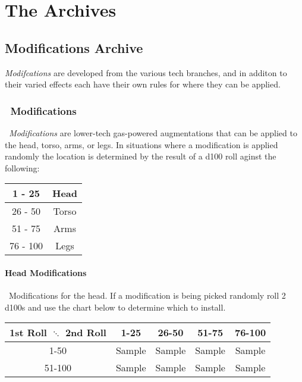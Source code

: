 \part{The Archives}\label{part:archives}
\chapter{Modifications Archive}\label{ch:ref_enhance}
\emph{Modifcations} are developed from the various tech branches, and in additon to their varied effects each have their own rules for where they can be applied. 

\section{\dieselt\ Modifications}\label{sec:diesel_mods}
\emph{\dieselt\ Modifications} are lower-tech gas-powered augmentations that can be applied to the head, torso, arms, or legs. In situations where a modification is applied randomly the location is determined by the result of a d100 roll aginst the following:
\begin{center}
\begin{tabular}{c | c}
1 - 25 & Head \\
\hline
26 - 50 & Torso \\
\hline
51 - 75 & Arms \\
\hline
76 - 100 & Legs \\
\end{tabular}
\end{center}

\subsection{Head Modifications}
\dieselt\ Modifications for the head. If a modification is being picked randomly roll 2 d100s and use the chart below to determine which to install.
\begin{center}
\begin{tabular}{c | c | c | c | c}
1st Roll $\ddots$ 2nd Roll & 1-25 & 26-50 & 51-75 & 76-100 \\
\hline
1-50 & Sample & Sample & Sample & Sample\\
\hline
51-100 & Sample & Sample & Sample & Sample\\
\end{tabular}
\end{center}
